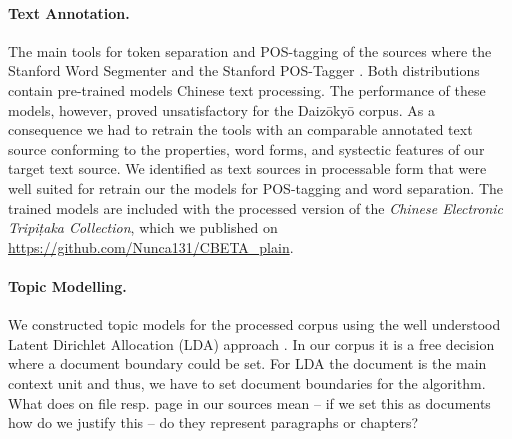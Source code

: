 \documentclass[a4paper,10pt]{article}
\newcommand{\TODO}[1]{\begingroup\color{red}#1\endgroup}
\begin{document}
\paragraph{Text Annotation.} 
The main tools for token separation and POS-tagging of the sources where
the Stanford Word Segmenter and the Stanford POS-Tagger
\cite{manning:2014}.  Both distributions contain pre-trained models Chinese
text processing. The performance of these models, however, proved
unsatisfactory for the Daiz{\=o}ky{\=o} corpus. As a consequence we had to
retrain the tools with an comparable annotated text source conforming to
the properties, word forms, and \TODO{systectic} features of our target
text source.  We identified  as text
sources in processable form that were well suited for retrain our the
models for POS-tagging and word separation. The trained models are included
with the processed version of the \textit{Chinese Electronic
  Tripi{\d{t}}aka Collection}, which we published on \url{https://github.com/Nunca131/CBETA_plain}.

\paragraph{Topic Modelling.}
  We constructed topic models for the processed corpus using the well
  understood Latent Dirichlet Allocation (LDA) approach 
  \cite{blei:2012,griffiths:2004}. In our corpus it is a free decision where 
  a document boundary could be set.  For LDA the document is the main context 
  unit and thus, we have to set document boundaries for the algorithm. 
  \TODO{What does on file resp. page in our sources mean -- if we set this as 
  documents how do we justify this -- do they represent paragraphs or chapters?}
\end{document}
